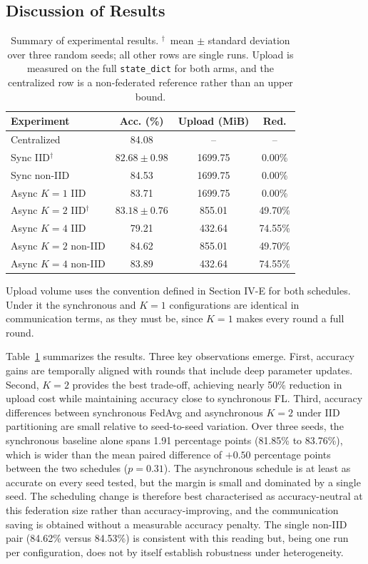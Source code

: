 \documentclass[10pt,conference]{IEEEtran}
\begin{document}
\subsection{Discussion of Results}
\begin{table}[!t]
\centering
\caption{Summary of experimental results. $^{\dagger}$~mean $\pm$ standard deviation over three random seeds; all other rows are single runs. Upload is measured on the full \texttt{state\_dict} for both arms, and the centralized row is a non-federated reference rather than an upper bound.}
\label{tab:summary}
\small
\setlength{\tabcolsep}{4pt}
\begin{tabular}{@{}lccc@{}}
\toprule
\textbf{Experiment} & \textbf{Acc. (\%)} & \textbf{Upload (MiB)} & \textbf{Red.} \\
\midrule
Centralized & 84.08 & -- & -- \\
\midrule
Sync IID$^{\dagger}$ & $82.68 \pm 0.98$ & 1699.75 & 0.00\% \\
Sync non-IID & 84.53 & 1699.75 & 0.00\% \\
\midrule
Async $K=1$ IID & 83.71 & 1699.75 & 0.00\% \\
Async $K=2$ IID$^{\dagger}$ & $83.18 \pm 0.76$ & 855.01 & 49.70\% \\
Async $K=4$ IID & 79.21 & 432.64 & 74.55\% \\
Async $K=2$ non-IID & 84.62 & 855.01 & 49.70\% \\
Async $K=4$ non-IID & 83.89 & 432.64 & 74.55\% \\
\bottomrule
\end{tabular}
\end{table}
Upload volume uses the convention defined in Section IV-E for both schedules. Under it the synchronous and $K=1$ configurations are identical in communication terms, as they must be, since $K=1$ makes every round a full round.

Table~\ref{tab:summary} summarizes the results. Three key observations emerge. First, accuracy gains are temporally aligned with rounds that include deep parameter updates. Second, $K=2$ provides the best trade-off, achieving nearly 50\% reduction in upload cost while maintaining accuracy close to synchronous FL. Third, accuracy differences between synchronous FedAvg and asynchronous $K=2$ under IID partitioning are small relative to seed-to-seed variation. Over three seeds, the synchronous baseline alone spans 1.91 percentage points (81.85\% to 83.76\%), which is wider than the mean paired difference of $+0.50$ percentage points between the two schedules ($p=0.31$). The asynchronous schedule is at least as accurate on every seed tested, but the margin is small and dominated by a single seed. The scheduling change is therefore best characterised as accuracy-neutral at this federation size rather than accuracy-improving, and the communication saving is obtained without a measurable accuracy penalty. The single non-IID pair (84.62\% versus 84.53\%) is consistent with this reading but, being one run per configuration, does not by itself establish robustness under heterogeneity.
\end{document}
